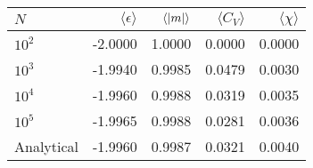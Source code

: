 \begin{tabular}{lrrrr}
\toprule
$N$ & $\langle \epsilon \rangle$ & $\langle \abs{m} \rangle$ & $\langle C_V \rangle$ & $\langle \chi \rangle$ \\
\midrule
$10^{2}$ & -2.0000 & 1.0000 & 0.0000 & 0.0000 \\
$10^{3}$ & -1.9940 & 0.9985 & 0.0479 & 0.0030 \\
$10^{4}$ & -1.9960 & 0.9988 & 0.0319 & 0.0035 \\
$10^{5}$ & -1.9965 & 0.9988 & 0.0281 & 0.0036 \\
Analytical & -1.9960 & 0.9987 & 0.0321 & 0.0040 \\
\bottomrule
\end{tabular}
